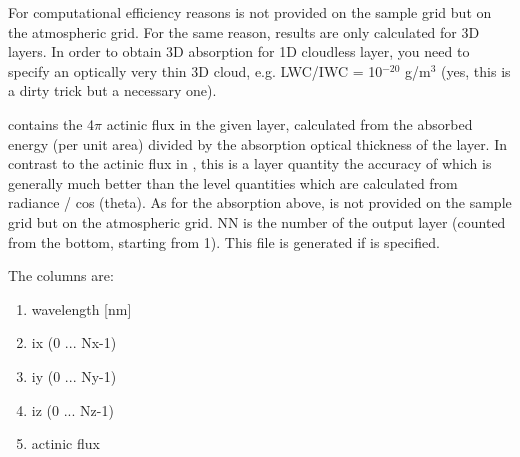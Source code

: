\begin{description}
{  For computational efficiency reasons  is not provided on the
  sample grid but on the atmospheric grid. For the same reason, results are 
  only calculated for 3D layers. In order to obtain 3D absorption for 1D
  cloudless layer, you need to specify an optically very thin 3D cloud, e.g.
  LWC/IWC = 10$^{-20}$ g/m$^3$ (yes, this is a dirty trick but a necessary one). 

 \item[mc.act.spc]
   contains the 4$\pi$ actinic flux in the given layer,
  calculated from the absorbed energy (per unit area) divided by the 
  absorption optical thickness of the layer. In contrast to the 
  actinic flux in , this is a layer quantity the 
  accuracy of which is generally much better than the level quantities 
  which are calculated from radiance / cos (theta). As for the absorption
  above,  is not provided on the sample grid but on the
  atmospheric grid. NN is the number of the output layer (counted from the
  bottom, starting from 1). This file is generated if  is specified. 
    
  The columns are:
  \begin{enumerate}
  \item  wavelength [nm]
  \item  ix (0 ... Nx-1)
  \item  iy (0 ... Ny-1)
  \item  iz (0 ... Nz-1)
  \item  actinic flux
  \end{enumerate}
}
\end{description}

